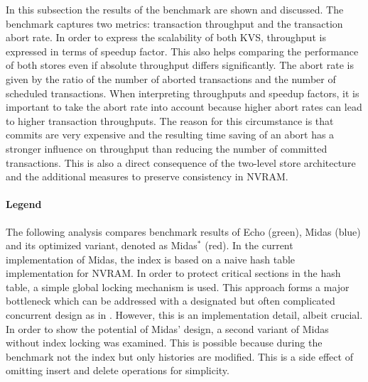 In this subsection the results of the benchmark are shown and discussed. The
benchmark captures two metrics: transaction throughput and the transaction abort
rate. In order to express the scalability of both KVS, throughput is expressed
in terms of speedup factor. This also helps comparing the performance of both
stores even if absolute throughput differs significantly. The abort rate is
given by the ratio of the number of aborted transactions and the number of
scheduled transactions. When interpreting throughputs and speedup factors, it is
important to take the abort rate into account because higher abort rates can
lead to higher transaction throughputs. The reason for this circumstance is that
commits are very expensive and the resulting time saving of an abort has a
stronger influence on throughput than reducing the number of committed
transactions. This is also a direct consequence of the two-level store
architecture and the additional measures to preserve consistency in NVRAM.

\paragraph{Legend}

The following analysis compares benchmark results of Echo (green), Midas (blue)
and its optimized variant, denoted as Midas$^{*}$ (red). In the current
implementation of Midas, the index is based on a naive hash table implementation
for NVRAM. In order to protect critical sections in the hash table, a simple
global locking mechanism is used. This approach forms a major bottleneck which
can be addressed with a designated but often complicated concurrent design as in
\cite{fan2013memc3}. However, this is an implementation detail, albeit crucial.
In order to show the potential of Midas' design, a second variant of Midas
without index locking was examined. This is possible because during the
benchmark not the index but only histories are modified. This is a side effect
of omitting insert and delete operations for simplicity.

\newcommand{\midasopt}{Midas$^{*}$\xspace}
\newcommand{\midas}{Midas\xspace}
\newcommand{\echo}{Echo\xspace}
\newcommand{\ttp}{transaction throughput\xspace}
\newcommand{\tput}{throughput\xspace}
\newcommand{\eff}{parallel efficiency\xspace}



